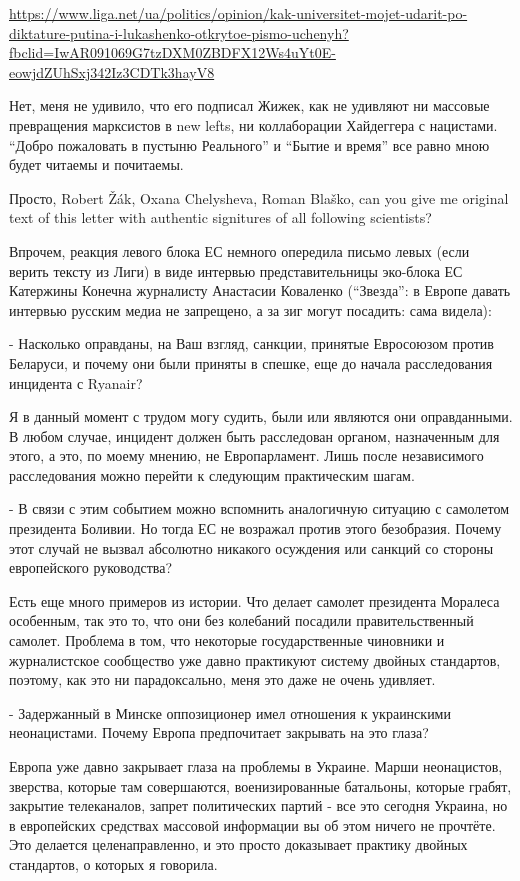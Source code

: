 \url{https://www.liga.net/ua/politics/opinion/kak-universitet-mojet-udarit-po-diktature-putina-i-lukashenko-otkrytoe-pismo-uchenyh?fbclid=IwAR091069G7tzDXM0ZBDFX12Ws4uYt0E-eowjdZUhSxj342Iz3CDTk3hayV8}

Нет, меня не удивило, что его подписал Жижек, как не удивляют ни массовые
превращения марксистов в new lefts, ни коллаборации Хайдеггера с нацистами.
\enquote{Добро пожаловать в пустыню Реального} и \enquote{Бытие и время} все
равно мною будет читаемы и почитаемы.

Просто, Robert Žák, Oxana Chelysheva, Roman Blaško, can you give me original
text of this letter with authentic signitures of all following scientists? 

Впрочем, реакция левого блока ЕС немного опередила письмо левых (если верить
тексту из Лиги) в виде интервью представительницы эко-блока ЕС Катержины
Конечна журналисту  Анастасии Коваленко (\enquote{Звезда}: в Европе давать интервью
русским медиа не запрещено, а за зиг могут посадить: сама видела):

- Насколько оправданы, на Ваш взгляд, санкции, принятые Евросоюзом против
Беларуси, и почему они были приняты в спешке, еще до начала расследования
инцидента с Ryanair?

Я в данный момент с трудом могу судить, были или являются они оправданными. В
любом случае, инцидент должен быть расследован органом, назначенным для этого,
а это, по моему мнению, не Европарламент. Лишь после независимого расследования
можно перейти к следующим практическим шагам.

- В связи с этим событием можно вспомнить аналогичную ситуацию с самолетом
президента Боливии. Но тогда ЕС не возражал против этого безобразия. Почему
этот случай не вызвал абсолютно никакого осуждения или санкций со стороны
европейского руководства?

Есть еще много примеров из истории. Что делает самолет президента Моралеса
особенным, так это то, что они без колебаний посадили правительственный
самолет. Проблема в том, что некоторые государственные чиновники и
журналистское сообщество уже давно практикуют систему двойных стандартов,
поэтому, как это ни парадоксально, меня это даже не очень удивляет.

- Задержанный в Минске оппозиционер имел отношения к украинскими неонацистами.
Почему Европа предпочитает закрывать на это глаза?

Европа уже давно закрывает глаза на проблемы в Украине. Марши неонацистов,
зверства, которые там совершаются, военизированные батальоны, которые грабят,
закрытие телеканалов, запрет политических партий - все это сегодня Украина, но
в европейских средствах массовой информации вы об этом ничего не прочтёте. Это
делается целенаправленно, и это просто доказывает практику двойных стандартов,
о которых я говорила.

